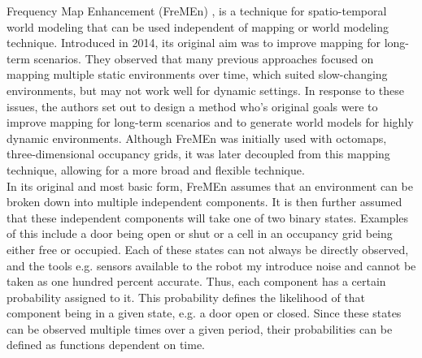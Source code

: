   Frequency Map Enhancement (FreMEn)\cite{Fentanes2014} , is a technique for
  spatio-temporal world modeling that can be used independent of mapping or
  world modeling technique. Introduced in 2014, its
  original aim was to improve mapping for long-term scenarios.
  They observed that many previous approaches focused on mapping multiple
  static environments over time, which suited slow-changing environments, but
  may not work well for dynamic settings. In response to these issues, the
  authors set out to design a method who's original goals were to improve mapping
  for long-term scenarios and
  to generate world models for highly dynamic environments.
  Although FreMEn was initially used with
  octomaps, three-dimensional occupancy grids, it was later decoupled from
  this mapping technique, allowing for a more broad and flexible technique. \\

  In its original and most basic form, FreMEn assumes that an environment can be
  broken down into multiple independent components. It is then further assumed
  that these independent components will take one of two binary states. Examples
  of this include a door being open or shut or a cell in
  an occupancy grid being either free or occupied. Each of these states can not
  always be directly observed, and the tools e.g. sensors available to the robot
  my introduce noise and cannot be taken as one hundred percent accurate. Thus,
  each component has a certain probability assigned to it. This
  probability defines the likelihood of that component being in a given state, e.g. a door
  open or closed. Since these states can be observed multiple times
  over a given period, their probabilities can be defined as
  functions dependent on time. \\


